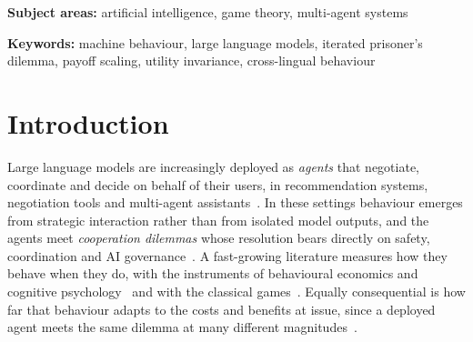 \documentclass[11pt,a4paper]{article}
\begin{document}
\noindent\textbf{Subject areas:} artificial intelligence, game theory,
multi-agent systems

\smallskip
\noindent\textbf{Keywords:} machine behaviour, large language models, iterated
prisoner's dilemma, payoff scaling, utility invariance, cross-lingual behaviour


%
%

\section{Introduction}
\label{sec:intro}

Large language models are increasingly deployed as \emph{agents} that negotiate,
coordinate and decide on behalf of their users, in recommendation systems,
negotiation tools and multi-agent
assistants~\citep{park2023generative,tessler2024ai,hammond2025multi,cook2024llm}.
In these settings behaviour emerges from strategic interaction rather than from
isolated model outputs, and the agents meet \emph{cooperation dilemmas} whose
resolution bears directly on safety, coordination and AI
governance~\citep{dafoe2021cooperative,lu2024llms,han2026social,idowu2026mapping}.
A fast-growing literature measures how they behave when they do, with the
instruments of behavioural economics and cognitive
psychology~\citep{binz2023using,horton2023large,aher2023using} and with the
classical games~\citep{mei2024turing}. Equally consequential is how far that
behaviour adapts to the costs and benefits at issue, since a deployed agent
meets the same dilemma at many different magnitudes~\citep{hammond2025multi}.
\end{document}
